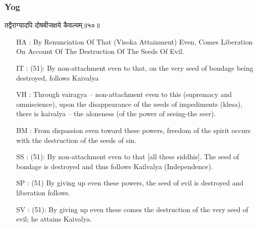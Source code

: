 \begin{frame}[fragile]\frametitle{Yog}
\begin{sanskrit}
तद्वैराग्यादपि दोषबीजक्षये कैवल्यम्॥५०॥
\end{sanskrit}

	\begin{itemize}
	\item [HA]: By Renunciation Of That (Visoka Attainment) Even, Comes Liberation On Account Of The Destruction Of The Seeds Of Evil.
	\item [IT]: (51): By non-attachment even to that, on the very seed of bondage being destroyed, follows Kaivalya
	\item [VH]: Through vairagya – non-attachment even to this (supremacy and omniscience), upon the disappearance of the seeds of impediments (klesa), there is kaivalya – the aloneness (of the power of seeing-the seer).
	\item [BM]: From dispassion even toward these powers, freedom of the spirit occurs with the destruction of the seeds of sin.
	\item [SS]: (51): By non-attachment even to that [all these siddhis]. The seed of bondage is destroyed and thus follows Kailvalya (Independence).
	\item [SP]: (51) By giving up even these powers, the seed of evil is destroyed and liberation follows.
	\item [SV]: (51): By giving up even these comes the destruction of the very seed of evil; he attains Kaivalya. 
	\end{itemize}
\end{frame}


